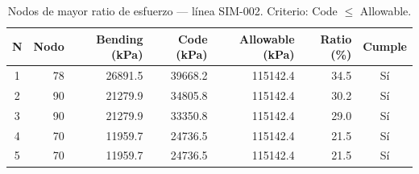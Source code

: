 \begin{table}[htbp]
  \centering
  \small
  \caption{Nodos de mayor ratio de esfuerzo — línea SIM-002. Criterio: Code $\leq$ Allowable.}
  \label{tab:top5-ratio}
  \begin{tabular}{crrrrrc}
    \toprule
    N & Nodo & Bending (\si{kPa}) & Code (\si{kPa}) & Allowable (\si{kPa}) & Ratio (\%) & Cumple \\
    \midrule
    1 & 78 & \num{26891.5} & \num{39668.2} & \num{115142.4} & 34.5 & Sí \\
    2 & 90 & \num{21279.9} & \num{34805.8} & \num{115142.4} & 30.2 & Sí \\
    3 & 90 & \num{21279.9} & \num{33350.8} & \num{115142.4} & 29.0 & Sí \\
    4 & 70 & \num{11959.7} & \num{24736.5} & \num{115142.4} & 21.5 & Sí \\
    5 & 70 & \num{11959.7} & \num{24736.5} & \num{115142.4} & 21.5 & Sí \\
    \bottomrule
  \end{tabular}
\end{table}
